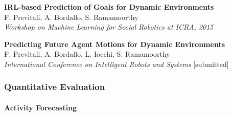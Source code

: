 \begin{frame}
	\tiny
	
	\textbf{IRL-based Prediction of Goals for Dynamic Environments}\\
	F. Previtali, A. Bordallo, S. Ramamoorthy \\
	\emph{Workshop on Machine Learning for Social Robotics at ICRA, 2015} \\
	
	\vspace{0.1cm}
	
	\textbf{Predicting Future Agent Motions for Dynamic Environments}\\
	F. Previtali, A. Bordallo, L. Iocchi, S. Ramamoorthy \\
	\emph{International Conference on Intelligent Robots and Systems} [submitted] \\
\end{frame}

\begin{frame}
	\frametitle{Quantitative Evaluation}
	\framesubtitle{Activity Forecasting}
	
	\begin{figure}
		\centering
	\end{figure}
\end{frame}

